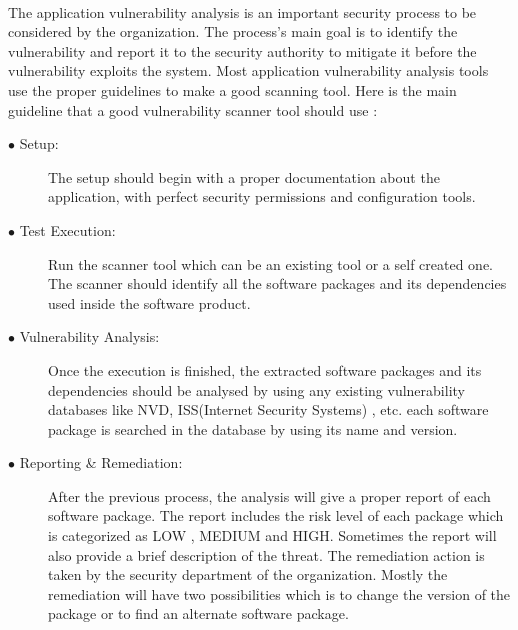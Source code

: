 \paragraph{}
The application vulnerability analysis is an important security process to be considered by the organization. The process's main goal is to identify the vulnerability and report it to the security authority to mitigate it before the vulnerability exploits the system. Most application vulnerability analysis tools use the proper guidelines to make a good scanning tool. Here is the main guideline that a good vulnerability scanner tool should use \cite{Syamini}:
\begin{description}
	\item [$\bullet$ Setup:] The setup should begin with a proper documentation about the application, with perfect security permissions and configuration tools.
	
	\item [$\bullet$ Test Execution:] Run the scanner tool which can be an existing tool or a self created one. The scanner should identify all the software packages and its dependencies used inside the software product.
	
	\item [$\bullet$ Vulnerability Analysis:] Once the execution is finished, the extracted software packages and its dependencies should be analysed by using any existing vulnerability databases like \acs{NVD}, ISS(Internet Security Systems) , etc. each software package is searched in the database by using its name and version.
	
	\item [$\bullet$ Reporting \& Remediation:] After the previous process, the analysis will give a proper report of each software package. The report includes the risk level of each package which is categorized as LOW , MEDIUM and  HIGH. Sometimes the report will also provide a brief description of the threat. The remediation action is taken by the security department of the organization. Mostly the remediation will have two possibilities which is to change the version of the package or to find an alternate software package.
\end{description}
